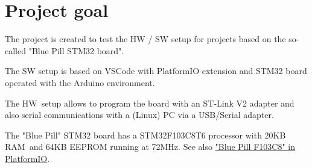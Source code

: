 \documentclass[11pt, oneside]{scrartcl}   	%
\begin{document}
\newpage
\thispagestyle{empty}
\tableofcontents
\newpage

\newpage
\thispagestyle{empty}
\listoffigures
\listoftables

\newpage
\pagestyle{scrheadings}
\section{Project goal}
The project is created to test the HW / SW setup for projects based on the so-called "Blue Pill STM32 board".

The SW setup is based on VSCode with PlatformIO extension and STM32 board operated with the Arduino environment.

The HW setup allows to program the board with an ST-Link V2 adapter and also serial communications with a (Linux) PC
via a USB/Serial adapter.

The "Blue Pill" STM32 board has a STM32F103C8T6 processor with 20KB RAM and 64KB EEPROM running at 72MHz.
See also \href{https://docs.platformio.org/en/latest//boards/ststm32/bluepill_f103c8.html}{"Blue Pill F103C8" in PlatformIO}.
\end{document}
